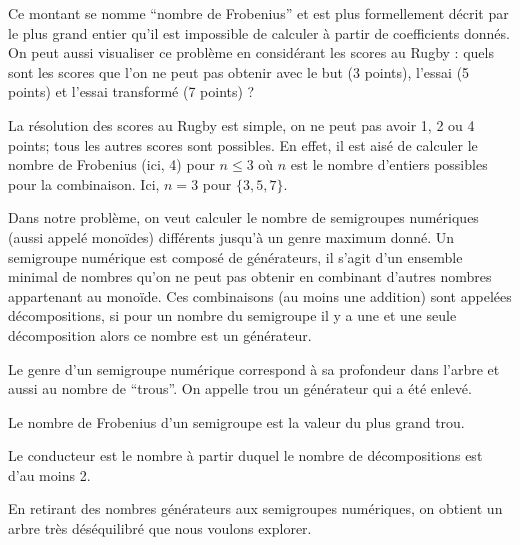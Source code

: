 \documentclass[12pt,a4paper]{report}
\let\leq\leqslant
\begin{document}
Ce montant se nomme ``nombre de Frobenius'' et est plus formellement décrit par le plus grand entier qu'il est impossible de calculer à partir de coefficients donnés. On peut aussi visualiser ce problème en considérant les scores au Rugby : quels sont les scores que l'on ne peut pas obtenir avec le but (3 points), l'essai (5 points) et l'essai transformé (7 points) ?

La résolution des scores au Rugby est simple, on ne peut pas avoir 1, 2 ou 4 points; tous les autres scores sont possibles. En effet, il est aisé de calculer le nombre de Frobenius (ici, 4) pour $n \leq 3$ où $n$ est le nombre d'entiers possibles pour la combinaison. Ici, $n = 3$ pour $\{3,5,7\}$.

Dans notre problème, on veut calculer le nombre de semigroupes numériques (aussi appelé monoïdes) différents jusqu'à un genre maximum donné. Un semigroupe numérique est composé de générateurs, il s'agit d'un ensemble minimal de nombres qu'on ne peut pas obtenir en combinant d'autres nombres appartenant au monoïde. Ces combinaisons (au moins une addition) sont appelées décompositions, si pour un nombre du semigroupe il y a une et une seule décomposition alors ce nombre est un générateur.

Le genre d'un semigroupe numérique correspond à sa profondeur dans l'arbre et aussi au nombre de ``trous''. On appelle trou un générateur qui a été enlevé.

Le nombre de Frobenius d'un semigroupe est la valeur du plus grand trou.

Le conducteur est le nombre à partir duquel le nombre de décompositions est d'au moins 2.

En retirant des nombres générateurs aux semigroupes numériques, on obtient un arbre très déséquilibré que nous voulons explorer.
\end{document}
